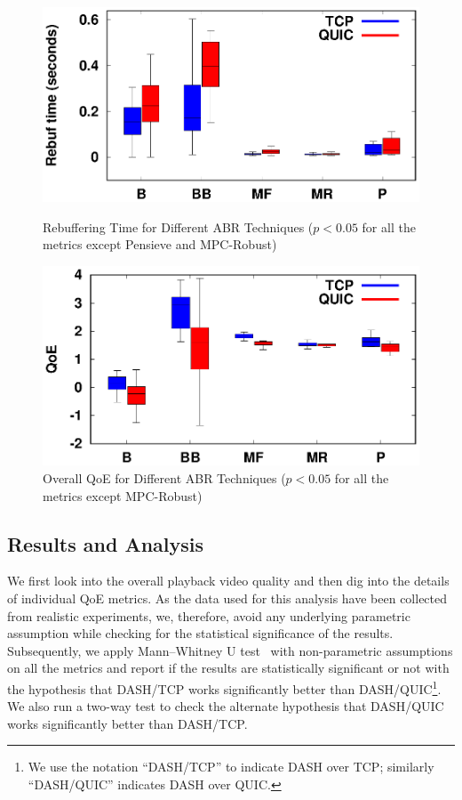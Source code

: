\begin{figure}[!t]
	\begin{minipage}[t]{0.48\linewidth}
		\includegraphics[width=\linewidth]{img/newexp/rebuf_box}
		\caption{\label{fig:chap03s2:RebufferTime_n}Rebuffering Time for Different ABR Techniques ($p<0.05$ for all the metrics except Pensieve and MPC-Robust)}
	\end{minipage}\hfill
	\begin{minipage}[t]{0.48\linewidth}
		\includegraphics[width=\linewidth]{img/newexp/qoe_box}
		\caption{\label{fig:chap03s2:QOE_n}Overall QoE for Different ABR Techniques ($p<0.05$ for all the metrics except MPC-Robust)}
	\end{minipage}
\end{figure}

\subsection{Results and Analysis}
We first look into the overall playback video quality and then dig into the details of individual QoE metrics. As the data used for this analysis have been collected from realistic experiments, we, therefore, avoid any underlying parametric assumption while checking for the statistical significance of the results. Subsequently, we apply Mann–Whitney U test~\cite{mannwhitney} with non-parametric assumptions on all the metrics and report if the results are statistically significant or not with the hypothesis that DASH/TCP works significantly better than DASH/QUIC\footnote{We use the notation ``DASH/TCP'' to indicate DASH over TCP; similarly ``DASH/QUIC'' indicates DASH over QUIC.}. We also run a two-way test to check the alternate hypothesis that DASH/QUIC works significantly better than DASH/TCP.




